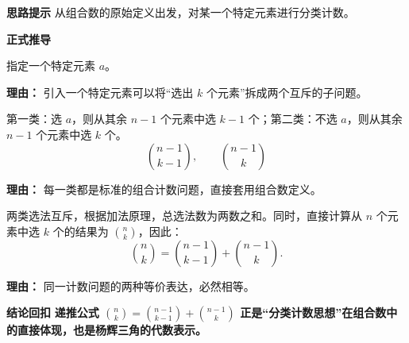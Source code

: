 \begin{proofbox}
	\textbf{\textcolor{CProof}{思路提示}}
	从组合数的原始定义出发，对某一个特定元素进行分类计数。

	\medskip
	\textbf{\textcolor{CProof}{正式推导}}
	\begin{description}[style=nextline, leftmargin=2.8em, labelsep=0.5em, itemsep=0.55em]
		\item[\textbf{步骤一（选定特元）：}]
			指定一个特定元素 $a$。
			\par\textbf{理由：} 引入一个特定元素可以将“选出 $k$ 个元素”拆成两个互斥的子问题。
		\item[\textbf{步骤二（分类计数）：}]
			第一类：选 $a$，则从其余 $n-1$ 个元素中选 $k-1$ 个；第二类：不选 $a$，则从其余 $n-1$ 个元素中选 $k$ 个。
			\[
				\binom{n-1}{k-1},
				\qquad
				\binom{n-1}{k}
			\]
			\par\textbf{理由：} 每一类都是标准的组合计数问题，直接套用组合数定义。
		\item[\textbf{步骤三（加法原理）：}]
			两类选法互斥，根据加法原理，总选法数为两数之和。同时，直接计算从 $n$ 个元素中选 $k$ 个的结果为 $\binom{n}{k}$，因此：
			\[
				\binom{n}{k} = \binom{n-1}{k-1} + \binom{n-1}{k}.
			\]
			\par\textbf{理由：} 同一计数问题的两种等价表达，必然相等。
	\end{description}

	\medskip
	\textbf{\textcolor{CProof}{结论回扣}}
	\textbf{递推公式 $\binom{n}{k} = \binom{n-1}{k-1} + \binom{n-1}{k}$ 正是“分类计数思想”在组合数中的直接体现，也是杨辉三角的代数表示。}
\end{proofbox}
